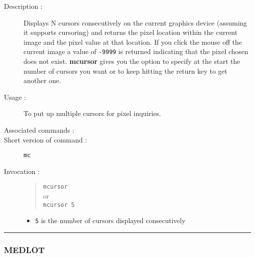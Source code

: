 \begin{description}

\item[Description :] Displays N cursors consecutively on the current
graphics device (assuming it supports cursoring) and returns the pixel
location within the current image and the pixel value at that location.
If you click the mouse off the current image a value of {\tt -9999} is
returned indicating that the pixel chosen does not exist.  {\bf mcursor}
gives you the option to specify at the start the number of cursors you
want or to keep hitting the return key to get another one.

\item[Usage :] To put up multiple cursors for pixel inquiries.
\item[Associated commands :] {\tt {}}
\item[Short version of command :] {\tt mc}
\item[Invocation :]

\begin{quote}{\tt  mcursor }\\
or \\
{\tt mcursor 5 }
\end{quote}

\begin{itemize}

\item {\tt 5} is the number of cursors displayed consecutively
\end{itemize}

\end{description}

\hrule
\subsubsection*{\label{MEDLOT}MEDLOT}

